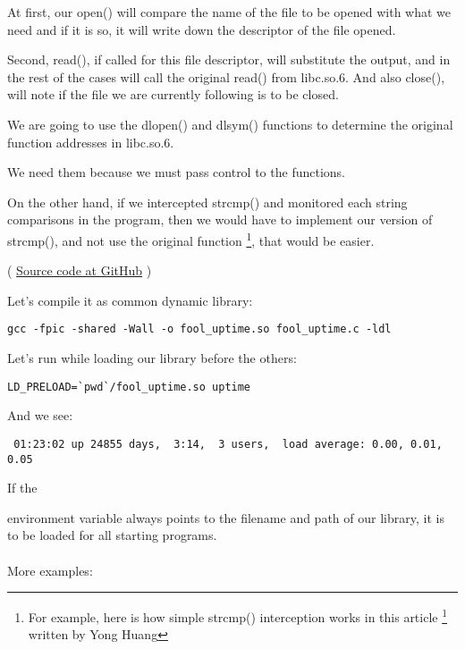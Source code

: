 At first, our open() will compare the name of the file to be opened with what we need and if it is so,
it will write down the descriptor of the file opened.

Second, read(), if called for this file descriptor, will substitute the output,
and in the rest of the cases will call the original read() from libc.so.6.
And also close(), 
will note if the file we are currently following is to be closed.


We are going to use the dlopen() and dlsym() functions to determine the original function addresses in libc.so.6.

We need them because we must pass control to the  functions.


On the other hand, if we intercepted strcmp() and monitored each string
comparisons in the program, then we would have to implement our version of strcmp(), and not
use the original function
\footnote{For example, here is how simple strcmp() interception works in this article
\footnote{\href{http://go.yurichev.com/17143}{yurichev.com}}
written by Yong Huang}, that would be easier.


( \href{https://github.com/dennis714/RE-for-beginners/blob/master/OS/LD_PRELOAD/fool_uptime.c}{Source code at GitHub} )

Let's compile it as common dynamic library:

\begin{lstlisting}
gcc -fpic -shared -Wall -o fool_uptime.so fool_uptime.c -ldl
\end{lstlisting}

Let's run 
while loading our library before the others:

\begin{lstlisting}
LD_PRELOAD=`pwd`/fool_uptime.so uptime
\end{lstlisting}

And we see:

\begin{lstlisting}
 01:23:02 up 24855 days,  3:14,  3 users,  load average: 0.00, 0.01, 0.05
\end{lstlisting}

If the  

environment variable always points to the filename and path of our library, 
it is to be loaded for all starting programs. \\
\\
More examples:

